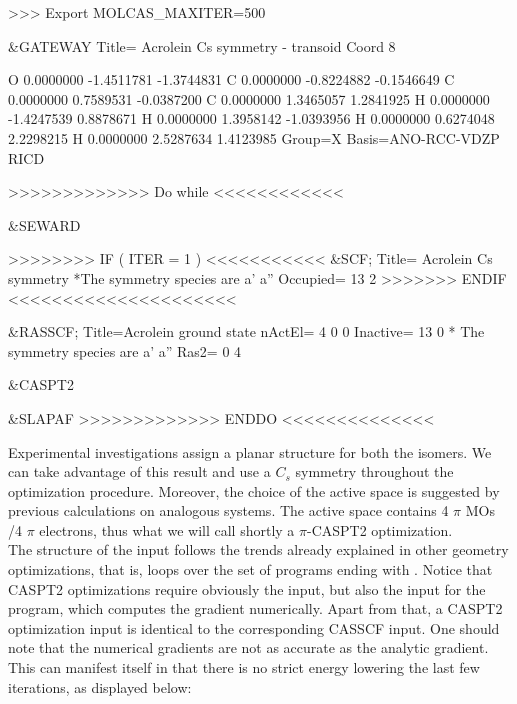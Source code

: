 \begin{inputlisting}
>>> Export MOLCAS_MAXITER=500

&GATEWAY
   Title= Acrolein Cs symmetry - transoid
   Coord
      8

    O      0.0000000     -1.4511781     -1.3744831
    C      0.0000000     -0.8224882     -0.1546649
    C      0.0000000      0.7589531     -0.0387200
    C      0.0000000      1.3465057      1.2841925
    H      0.0000000     -1.4247539      0.8878671
    H      0.0000000      1.3958142     -1.0393956
    H      0.0000000      0.6274048      2.2298215
    H      0.0000000      2.5287634      1.4123985
    Group=X
    Basis=ANO-RCC-VDZP
    RICD

>>>>>>>>>>>>> Do while <<<<<<<<<<<<

&SEWARD

>>>>>>>> IF ( ITER = 1 ) <<<<<<<<<<<
&SCF; Title= Acrolein Cs symmetry
*The symmetry species are a'  a''
Occupied= 13 2
>>>>>>> ENDIF <<<<<<<<<<<<<<<<<<<<<

&RASSCF; Title=Acrolein ground state
   nActEl= 4 0 0
   Inactive= 13 0
*  The symmetry species are a'  a''
   Ras2= 0 4

&CASPT2

&SLAPAF
>>>>>>>>>>>>> ENDDO  <<<<<<<<<<<<<<
\end{inputlisting}

Experimental investigations assign a planar structure for both the
isomers. We can take advantage of this result and use a $C_s$ symmetry
throughout the optimization procedure. Moreover, the choice of the
active space is suggested by previous calculations on analogous
systems. The active space contains 4 $\pi$ MOs /4 $\pi$ electrons, thus
what we will call shortly a $\pi$-CASPT2 optimization.  \\

The structure of the input follows the trends already explained in
other geometry optimizations, that is, loops over the set of programs
ending with . Notice that CASPT2 optimizations require
obviously the  input, but also the input for the
 program, which computes the gradient numerically.
Apart from that, a CASPT2 optimization input is identical to the corresponding
CASSCF input. 
One should note that the numerical gradients are not as accurate as the
analytic gradient. This can manifest itself in that there is no strict energy
lowering the last few iterations, as displayed below:

